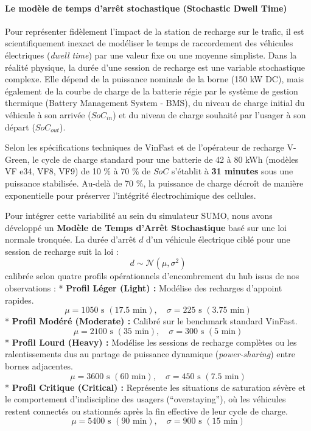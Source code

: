 \documentclass[11pt, a4paper]{article}
\begin{document}
\paragraph{Le modèle de temps d'arrêt stochastique (Stochastic Dwell
Time)}\label{le-moduxe8le-de-temps-darruxeat-stochastique-stochastic-dwell-time}

Pour représenter fidèlement l'impact de la station de recharge sur le
trafic, il est scientifiquement inexact de modéliser le temps de
raccordement des véhicules électriques (\emph{dwell time}) par une
valeur fixe ou une moyenne simpliste. Dans la réalité physique, la durée
d'une session de recharge est une variable stochastique complexe. Elle
dépend de la puissance nominale de la borne (150 kW DC), mais également
de la courbe de charge de la batterie régie par le système de gestion
thermique (Battery Management System - BMS), du niveau de charge initial
du véhicule à son arrivée (\(SoC_{in}\)) et du niveau de charge souhaité
par l'usager à son départ (\(SoC_{out}\)).

Selon les spécifications techniques de VinFast et de l'opérateur de
recharge V-Green, le cycle de charge standard pour une batterie de 42 à
80 kWh (modèles VF e34, VF8, VF9) de 10 \% à 70 \% de \(SoC\) s'établit
à \textbf{31 minutes} sous une puissance stabilisée. Au-delà de 70 \%,
la puissance de charge décroît de manière exponentielle pour préserver
l'intégrité électrochimique des cellules.

Pour intégrer cette variabilité au sein du simulateur SUMO, nous avons
développé un \textbf{Modèle de Temps d'Arrêt Stochastique} basé sur une
loi normale tronquée. La durée d'arrêt \(d\) d'un véhicule électrique
ciblé pour une session de recharge suit la loi :
\[d \sim \mathcal{N}(\mu, \sigma^2)\] calibrée selon quatre profils
opérationnels d'encombrement du hub issus de nos observations : *
\textbf{Profil Léger (Light) :} Modélise des recharges d'appoint
rapides.
\[\mu = 1050 \text{ s } (17.5 \text{ min}), \quad \sigma = 225 \text{ s } (3.75 \text{ min})\]
* \textbf{Profil Modéré (Moderate) :} Calibré sur le benchmark standard
VinFast.
\[\mu = 2100 \text{ s } (35 \text{ min}), \quad \sigma = 300 \text{ s } (5 \text{ min})\]
* \textbf{Profil Lourd (Heavy) :} Modélise les sessions de recharge
complètes ou les ralentissements dus au partage de puissance dynamique
(\emph{power-sharing}) entre bornes adjacentes.
\[\mu = 3600 \text{ s } (60 \text{ min}), \quad \sigma = 450 \text{ s } (7.5 \text{ min})\]
* \textbf{Profil Critique (Critical) :} Représente les situations de
saturation sévère et le comportement d'indiscipline des usagers
(``overstaying''), où les véhicules restent connectés ou stationnés
après la fin effective de leur cycle de charge.
\[\mu = 5400 \text{ s } (90 \text{ min}), \quad \sigma = 900 \text{ s } (15 \text{ min})\]
\end{document}
